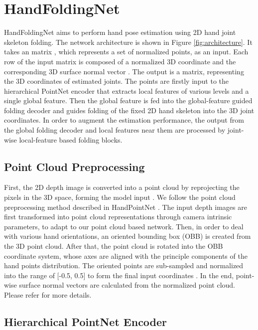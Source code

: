 \documentclass[10pt,twocolumn,letterpaper]{article}
\begin{document}
\section{HandFoldingNet}



HandFoldingNet aims to perform hand pose estimation using 2D hand joint skeleton folding. The network architecture is shown in Figure \ref{fig:architecture}. It takes an  matrix , which represents a set of normalized points, as an input. Each row of the input matrix is composed of a normalized 3D  coordinate  and the corresponding 3D surface normal vector . The output is a  matrix, representing the 3D coordinates of estimated  joints. The  points are firstly input to the hierarchical PointNet encoder that extracts local features of various levels and a single global feature. Then the global feature is fed into the global-feature guided folding decoder and guides folding of the fixed 2D hand skeleton into the 3D joint coordinates. In order to augment the estimation performance, the output from the global folding decoder and local features near them are processed by joint-wise local-feature based folding blocks.

\subsection{Point Cloud Preprocessing}
First, the 2D depth image is converted into a point cloud by reprojecting the pixels in the 3D space, forming the model input .
We follow the point cloud preprocessing method described in HandPointNet \cite{ge2018hand}. The input depth images are first transformed into point cloud representations through camera intrinsic parameters, to adapt to our point cloud based network. Then, in order to deal with various hand orientations, an oriented bounding box (OBB) is created from the 3D point cloud. After that, the point cloud is rotated into the OBB coordinate system, whose axes are aligned with the principle components of the hand points distribution. The oriented points are sub-sampled and normalized into the range of [-0.5, 0.5] to form the final input coordinates . In the end, point-wise surface normal vectors  are calculated from the normalized point cloud. Please refer \cite{ge2018hand} for more details.




\subsection{Hierarchical PointNet Encoder}
\end{document}
